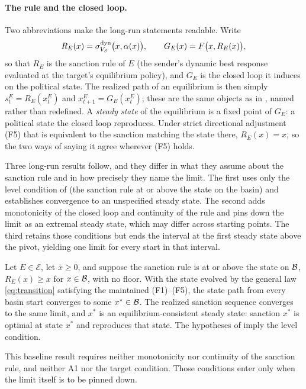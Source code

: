 \paragraph{The rule and the closed loop.}
Two abbreviations make the long-run statements readable. Write
\[
R_E(x)=\sigma^{\mathrm{dyn}}_{V_S}\bigl(x,\alpha(x)\bigr),
\qquad
G_E(x)=F\bigl(x,R_E(x)\bigr),
\]
so that $R_E$ is the sanction rule of $E$ (the sender's dynamic best
response evaluated at the target's equilibrium policy), and $G_E$ is the closed
loop it induces on the political state. The realized path of an equilibrium is
then simply $s^E_t=R_E(x^E_t)$ and $x^E_{t+1}=G_E(x^E_t)$; these are the same
objects as in , named rather than redefined. A \emph{steady
state} of the equilibrium is a fixed point of $G_E$: a political state the closed
loop reproduces. Under strict directional adjustment \textup{(F5)} that is
equivalent to the sanction matching the state there, $R_E(x)=x$, so the two ways
of saying it agree wherever \textup{(F5)} holds.

Three long-run results follow, and they differ in what they assume about the
sanction rule and in how precisely they name the limit. The first
uses only the level condition of  (the sanction rule
at or above the state on the basin) and establishes convergence to an
unspecified steady state. The second adds monotonicity of the closed loop and
continuity of the rule and pins down the limit as an extremal steady state,
which may differ across starting points. The third retains those conditions but ends the interval at the first
steady state above the pivot, yielding one limit for every start in that interval.

\begin{proposition}
\label{prop:longrun}
Let $E\in\mathcal E$, let $\bar x\ge0$, and suppose the sanction rule is at
or above the state on $\mathcal{B}$, $R_E(x)\ge x$ for $x\in\mathcal{B}$, with no
floor. With the state evolved by the general law \eqref{eq:transition}
satisfying the maintained \textup{(F1)--(F5)}, the state path from every
basin start converges to some $x^\ast\in\mathcal{B}$. The realized sanction
sequence converges to the same limit, and $x^\ast$ is an
equilibrium-consistent steady state: sanction $x^\ast$ is optimal at state
$x^\ast$ and reproduces that state. The hypotheses of 
imply the level condition.
\end{proposition}

This baseline result requires neither monotonicity nor continuity of the sanction
rule, and neither A1 nor the target condition. Those conditions enter only when the
limit itself is to be pinned down.


